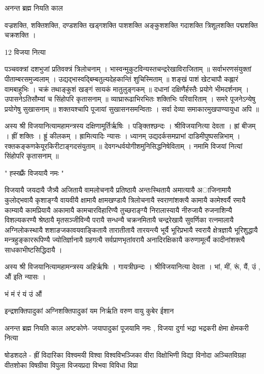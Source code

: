 अनन्त ब्रह्म नियति काल 				
																		
वज्रशक्ति, शक्तिशक्ति, दण्डशक्ति खड्गशक्ति पाशशक्ति अङ्कुशशक्ति गदाशक्ति त्रिशूलशक्ति पद्मशक्ति चक्रशक्ति ।



12 विजया नित्या 

पञ्चवक्त्रां दशभुजां प्रतिवक्त्रं त्रिलोचनाम् ।
भास्वन्मुकुटविन्यस्तचन्द्ररेखाविराजिताम्  ॥
सर्वाभरणसंयुक्तां पीताम्बरसमुज्वलाम् ।
उद्यद्भास्वद्बिम्बतुल्यदेहकान्तिं शुचिस्मिताम् ॥
शङ्खं पाशं खेटचापौ कह्लारं वामबाहुभिः ।
चक्रं तथाङ्कुशं खङ्गं सायकं मातुलुङ्गकम् ॥
दधानां दक्षिणैर्हस्तैः प्रयोगे भीमदर्शनाम् ।
उपासनेऽतिसौम्यां च सिंहोपरि कृतासनाम् ॥
व्याघ्रारूढाभिरभितः शक्तिभिः परिवारिताम् ।
समरे पूजनेऽन्येषु प्रयोगेषु सुखासनाम् ॥
शक्तयश्चापि पूजायां सुखासनसमन्विताः ।
सर्वा देव्या समाकारमुखपाण्यायुधा अपि ॥

अस्य श्री विजयानित्यामहामन्त्रस्य दक्षिणामूर्तिर्ऋषिः । पङ्क्तिश्छन्दः । श्रीविजयानित्या देवता । ह्रां बीजम् । ह्रीं शक्तिः । ह्रूं कीलकम् ।
ह्रामित्यादिः न्यासः ।
ध्यानम् उद्यदर्कसमप्राभां दाडिमीपुष्पसन्निभाम् । रक्तकङ्कणकेयूरकिरीटाङ्गदसंयुताम् ॥
देवगन्धर्वयोगीशमुनिसिद्धनिषेविताम् । नमामि विजयां नित्यां सिंहोपरि कृतासनाम् ॥

" ह्स्ख्फ्रैं विजयायै नमः "

विजयायै जयदायै जैत्र्यै अजितायै वामलोचनायै प्रतिष्ठायै अन्तःस्थितायै अमात्यायै अाजिनामायै कुलोद्भवायै कृशाङ्ग्यै वायवीयै क्षामायै क्षामखण्डायै त्रिलोचनायै स्वराणांशक्त्यै कामायै कामेश्वर्यै रमायै  काम्यायै कामप्रियायै अकामायै कामचारविहारिण्यै तुच्छराङ्ग्यै निरालास्यायै नीरुजायै रुजनाशिन्यै विशल्यकरण्यै श्रेष्ठायै मृतसञ्जीविन्यै परायै सन्धन्यै चक्रनमितायै चन्द्ररेखायै सुवर्णिका रत्नमालायै अग्निलोकस्थायै शशाङजकावयवाङ्कितायै तारातीतायै तारयन्त्यै भूर्यै भूरिप्रभायै स्वरायै क्षेत्रज्ञायै भूरिशुद्धायै मन्त्रहुङ्काररूपिण्यै ज्योतिर्ज्ञानायै ग्रहगत्यै सर्वप्राणभृतांवरायै अनादिरक्षिकायै करुणामूर्त्यै कादीनांशक्त्यै साधकाभीष्टसिद्धिदायै ।


अस्य श्री विजयानित्यामहामन्त्रस्य अहिर्ऋषिः । गायत्रीछन्दः । श्रीविजयानित्या देवता ।
भां, मीं, रूं, यैं, उं , औं  इति न्यासः ।

भं मं रं यं उं औं 


इन्द्रशक्तिपादुकां अग्निशक्तिपादुकां यम निर्ऋति वरुण वायु कुबेर ईशान 								

अनन्त ब्रह्म नियति काल 				
अष्टकोणे-
जयापादुकां पूजयामि नमः , विजया दुर्गा भद्रा भद्रकरी क्षेमा क्षेमकरी नित्या

षोडशदले -
ह्रीं विदारिका विश्वमयी विश्वा विश्वविभञ्जिका वीरा विक्षोभिणी विद्या विनोदा अञ्चितविग्रहा वीतशोका विषग्रीवा विपुला विजयप्रदा विभवा विविधा विप्रा 

